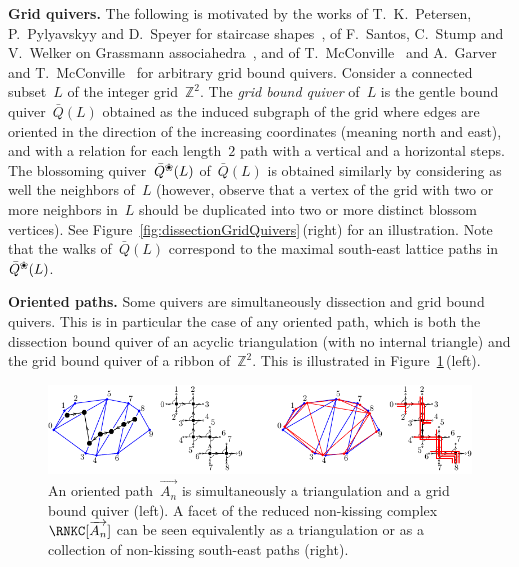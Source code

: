 \documentclass{amsart}
\theoremstyle{definition}
\newcommand{\Z}{\mathbb{Z}} %
\newcommand{\fref}[1]{Figure~\ref{#1}} %
\newcommand{\darkblue}{\color{darkblue}} %
\newcommand{\defn}[1]{\textsl{\darkblue #1}} %
\newcommand{\para}[1]{\medskip\noindent\textbf{#1.}} %
\newcommand{\exmAn}{\overrightarrow{A_n}} %
\newcommand{\blossom}{^\text{\ding{96}}} %
\begin{document}
\para{Grid quivers}
The following is motivated by the works of T.~K.~Petersen, P.~Pylyavskyy and D.~Speyer for staircase shapes~\cite{PetersenPylyavskyySpeyer}, of F.~Santos, C.~Stump and V.~Welker on Grassmann associahedra~\cite{SantosStumpWelker}, and of T.~McConville~\cite{McConville} and A.~Garver and T.~McConville~\cite{GarverMcConville-grid} for arbitrary grid bound quivers.
Consider a connected subset~$L$ of the integer grid~$\Z^2$.
The \defn{grid bound quiver} of~$L$ is the gentle bound quiver~$\bar Q(L)$ obtained as the induced subgraph of the grid where edges are oriented in the direction of the increasing coordinates (meaning north and east), and with a relation for each length~$2$ path with a vertical and a horizontal steps.
The blossoming quiver~$\bar Q\blossom(L)$ of~$\bar Q(L)$ is obtained similarly by considering as well the neighbors of~$L$ (however, observe that a vertex of the grid with two or more neighbors in~$L$ should be duplicated into two or more distinct blossom vertices).
See \fref{fig:dissectionGridQuivers}\,(right) for an illustration.
Note that the walks of~$\bar Q(L)$ correspond to the maximal south-east lattice paths in~$\bar Q\blossom(L)$.

\para{Oriented paths}
Some quivers are simultaneously dissection and grid bound quivers. This is in particular the case of any oriented path, which is both the dissection bound quiver of an acyclic triangulation (with no internal triangle) and the grid bound quiver of a ribbon of~$\Z^2$. This is illustrated in \fref{fig:exmBijectionAssociahedron}\,(left).

\begin{figure}[t]
	\capstart
	\centerline{\includegraphics[scale=1.4]{exmBijectionAssociahedron}}
	\caption{An oriented path~$\exmAn$ is simultaneously a triangulation and a grid bound quiver (left). A facet of the reduced non-kissing complex~$\RNKC[\exmAn]$ can be seen equivalently as a triangulation or as a collection of non-kissing south-east paths (right).}
	\label{fig:exmBijectionAssociahedron}
\end{figure}
\end{document}
